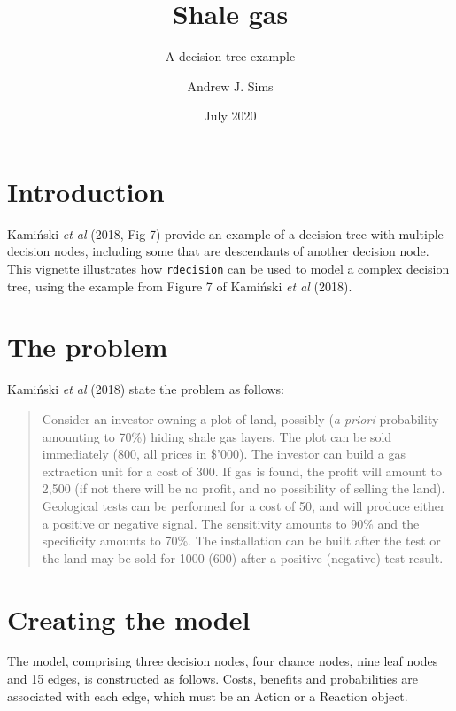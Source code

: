 \documentclass[]{article}
\title{Shale gas}
\subtitle{A decision tree example}
\author{Andrew J. Sims}
\date{July 2020}
\begin{document}
\maketitle

\hypertarget{introduction}{%
\section{Introduction}\label{introduction}}

Kamiński \emph{et al} (2018, Fig 7) provide an example of a decision
tree with multiple decision nodes, including some that are descendants
of another decision node. This vignette illustrates how
\texttt{rdecision} can be used to model a complex decision tree, using
the example from Figure 7 of Kamiński \emph{et al} (2018).

\hypertarget{the-problem}{%
\section{The problem}\label{the-problem}}

Kamiński \emph{et al} (2018) state the problem as follows:

\begin{quote}
Consider an investor owning a plot of land, possibly (\emph{a priori}
probability amounting to 70\%) hiding shale gas layers. The plot can be
sold immediately (800, all prices in \$'000). The investor can build a
gas extraction unit for a cost of 300. If gas is found, the profit will
amount to 2,500 (if not there will be no profit, and no possibility of
selling the land). Geological tests can be performed for a cost of 50,
and will produce either a positive or negative signal. The sensitivity
amounts to 90\% and the specificity amounts to 70\%. The installation
can be built after the test or the land may be sold for 1000 (600) after
a positive (negative) test result.
\end{quote}

\hypertarget{creating-the-model}{%
\section{Creating the model}\label{creating-the-model}}

The model, comprising three decision nodes, four chance nodes, nine leaf
nodes and 15 edges, is constructed as follows. Costs, benefits and
probabilities are associated with each edge, which must be an Action or
a Reaction object.
\end{document}
